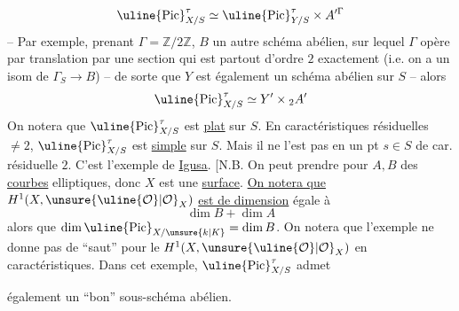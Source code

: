 \[
\uline{\operatorname{Pic}}_{X/S}^{\tau}\simeq\uline{\operatorname{Pic}}_{Y/S}^{\tau}\times A'^{\Gamma}
\]
-- Par exemple, prenant $\Gamma=\mathbb Z/2\mathbb Z$,  $B$ un autre schéma abélien, sur lequel $\Gamma$ opère par translation par une section qui est partout d'ordre $2$ exactement (i.e. on a un isom de $\Gamma_S\longrightarrow B$) -- de sorte que $Y$ est également un schéma abélien sur $S$ -- alors
\[
\uline{\operatorname{Pic}}_{X/S}^{\tau}\simeq Y'\times {}_2 A'
\]
On notera que $\uline{\operatorname{Pic}}_{X/S}^{\tau}$ est \uline{plat} sur $S$.
En caractéristiques résiduelles $\ne 2$, $\uline{\operatorname{Pic}}_{X/S}^{\tau}$ est \unsure{$=$}  \uline{simple} sur $S$. Mais il ne l'est pas en un pt $s\in S$ de car. résiduelle $2$.
C'est l'exemple de \uline{Igusa}. [N.B. On peut prendre pour $A,B$ des \uline{courbes} elliptiques, donc $X$ est une \uline{surface}.  \uline{On notera que} $H^1(X,\unsure{\uline{\mathcal O}|\mathcal O}_X)$ \uline{est de dimension} égale à
\[
\dim B+\dim A
\]
alors que $\dim\uline{\operatorname{Pic}}_{X/\unsure{k|K}}=\dim B$. On notera que l'exemple ne donne pas de ``saut'' pour le $H^1(X,\unsure{\uline{\mathcal O}|\mathcal O}_X)$ en  caractéristiques. Dans cet exemple, $\uline{\operatorname{Pic}}_{X/S}^{\tau}$ admet

également un ``bon'' sous-schéma abélien.

